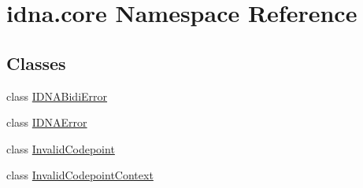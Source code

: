 \hypertarget{namespaceidna_1_1core}{}\section{idna.\+core Namespace Reference}
\label{namespaceidna_1_1core}
\subsection*{Classes}
\begin{DoxyCompactItemize}
\item 
class \hyperlink{classidna_1_1core_1_1_i_d_n_a_bidi_error}{I\+D\+N\+A\+Bidi\+Error}
\item 
class \hyperlink{classidna_1_1core_1_1_i_d_n_a_error}{I\+D\+N\+A\+Error}
\item 
class \hyperlink{classidna_1_1core_1_1_invalid_codepoint}{Invalid\+Codepoint}
\item 
class \hyperlink{classidna_1_1core_1_1_invalid_codepoint_context}{Invalid\+Codepoint\+Context}
\end{DoxyCompactItemize}

